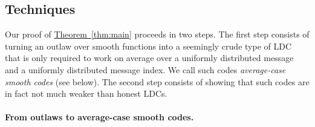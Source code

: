 \documentclass[11pt]{article}
\numberwithin{equation}{section}
\theoremstyle{definition}
\theoremstyle{plain}
\newcommand{\expref}[2]{\hyperref[#2]{#1~\ref{#2}}}
\begin{document}
%
\subsection{Techniques}

Our proof of \expref{Theorem}{thm:main} proceeds in two steps.
The first step consists of turning an outlaw over smooth functions into a seemingly crude type of LDC that is only required to work on average over a uniformly distributed message and a uniformly distributed message index.
We call such codes \emph{average-case smooth codes} (see below).
The second step consists of showing that such codes are in fact not much weaker than honest LDCs. 

\medskip
\paragraph{From outlaws to average-case smooth codes.}
\end{document}
